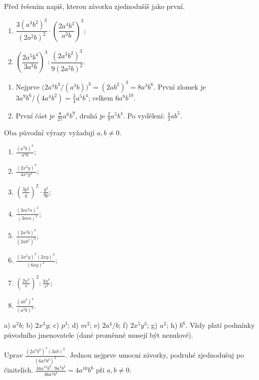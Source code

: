\documentclass[11pt,a4paper]{article}
\begin{document}
\begin{prikladReseniBox}[title={Příklad 3}]
Před řešením napiš, kterou závorku zjednodušíš jako první.
\begin{enumerate}[label=\alph*)]
\item $\dfrac{3(a^3b^2)^3}{(2a^2b)^2}\cdot
\left(\dfrac{2a^4b^3}{a^3b}\right)^3$;
\item $\left(\dfrac{2a^5b^4}{3a^3b}\right)^3:
\dfrac{(2a^3b^2)^3}{9(2a^2b)^2}$.
\end{enumerate}
\tcblower
\begin{enumerate}[label=\alph*)]
\item Nejprve $\bigl(2a^4b^3/(a^3b)\bigr)^3=(2ab^2)^3=8a^3b^6$.
První zlomek je $3a^9b^6/(4a^4b^2)=\frac34a^5b^4$;
celkem $\boxed{6a^8b^{10}}$.
\item První část je $\frac8{27}a^6b^9$, druhá je $\frac29a^5b^4$.
Po vydělení: $\boxed{\frac43ab^5}$.
\end{enumerate}
Oba původní výrazy vyžadují $a,b\ne0$.
\end{prikladReseniBox}
\begin{zadaniReseniBox}[title={Samostatná práce 3}]
\begin{enumerate}[label=\alph*)]
\item $\frac{(a^3b)^2}{a^4b}$;
\item $\frac{(2x^2y)^3}{4x^3y^2}$;
\item $\left(\frac{3p^2}{q}\right)^2\cdot\frac{q^2}{9p}$;
\item $\frac{(3m^2n)^2}{(3mn)^2}$;
\item $\frac{(2a^2b)^3}{(2ab^2)^2}$;
\item $\frac{(3x^2y)^2(2xy)^3}{(6xy)^2}$;
\item $\left(\frac{2u^3}{v}\right)^2:\frac{4u^4}{v^2}$;
\item $\frac{(ab^2)^4}{(a^2b)^2}$.
\end{enumerate}
\tcblower
 a) $a^2b$; b) $2x^3y$; c) $p^3$; d) $m^2$;
 e) $2a^4/b$; f) $2x^5y^3$; g) $u^2$; h) $b^6$.
Vždy platí podmínky původního jmenovatele (dané proměnné musejí být nenulové).
\end{zadaniReseniBox}
\begin{zadaniReseniBox}[title={Rozšíření 3},breakable=false]
Uprav $\displaystyle\frac{(2a^3b^2)^4(3ab)^2}{(6a^2b^2)^2}$.
Jednou nejprve umocni závorky, podruhé zjednodušuj po činitelích.
\tcblower
$\frac{16a^{12}b^8\cdot9a^2b^2}{36a^4b^4}=\boxed{4a^{10}b^6}$
při $a,b\ne0$.
\end{zadaniReseniBox}
\end{document}
